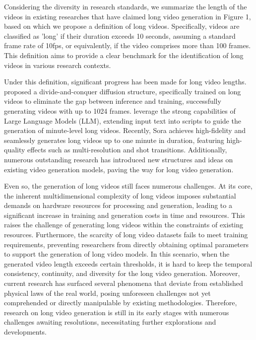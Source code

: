 \documentclass{article}
\begin{document}
Considering the diversity in research standards, we summarize the length of the videos in existing researches that have claimed long video generation in Figure 1, based on which we propose a definition of long videos. Specifically, videos are classified as 'long' if their duration exceeds 10 seconds, assuming a standard frame rate of 10fps, or equivalently, if the video comprises more than 100 frames. This definition aims to provide a clear benchmark for the identification of long videos in various research contexts.


Under this definition, significant progress has been made for long video lengths. \cite{NUWA-XL} proposed a divide-and-conquer diffusion structure, specifically trained on long videos to eliminate the gap between inference and training, successfully generating videos with up to 1024 frames.
\cite{vlogger} leverage the strong capabilities of Large Language Models (LLM), extending input text into scripts to guide the generation of minute-level long videos. 
Recently, Sora \citep{Sora} achieves high-fidelity and seamlessly generates long videos up to one minute in duration, featuring high-quality effects such as multi-resolution and shot transitions.
Additionally, numerous outstanding research has introduced new structures and ideas on existing video generation models, paving the way for long video generation.


Even so, the generation of long videos still faces numerous challenges. At its core, the inherent multidimensional complexity of long videos imposes substantial demands on hardware resources for processing and generation, leading to a significant increase in training and generation costs in time and resources. This raises the challenge of generating long videos within the constraints of existing resources. Furthermore, the scarcity of long video datasets fails to meet training requirements, preventing researchers from directly obtaining optimal parameters to support the generation of long video models. In this scenario, when the generated video length exceeds certain thresholds, it is hard to keep the temporal consistency, continuity, and diversity for the long video generation. Moreover, current research has surfaced several phenomena that deviate from established physical laws of the real world, posing unforeseen challenges not yet comprehended or directly manipulable by existing methodologies.
Therefore, research on long video generation is still in its early stages with numerous challenges awaiting resolutions, necessitating further explorations and developments.
\end{document}
